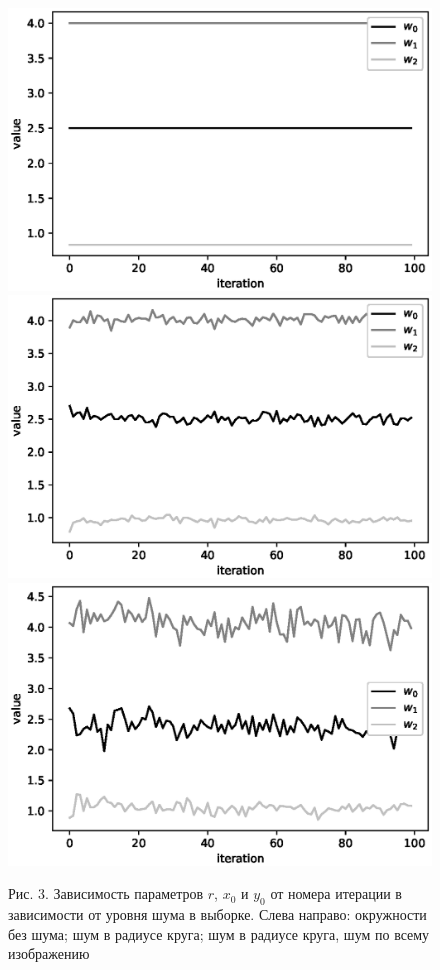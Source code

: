 \documentclass[12pt]{a&t}
\begin{document}
\begin{figure}[h!]
\begin{center}
	\includegraphics[height = 0.2\textheight]{900noise.eps}
	\includegraphics[height = 0.2\textheight]{901noise.eps}\\
	\includegraphics[height = 0.2\textheight]{902noise.eps}
\end{center}
\caption{Рис. 3. Зависимость параметров $r$, $x_0$ и $y_0$ от номера итерации в зависимости от уровня шума в выборке. Слева направо: окружности без шума; шум в радиусе круга; шум в радиусе круга, шум по всему изображению}
\label{ce:fig4}
\end{figure}
\end{document}
